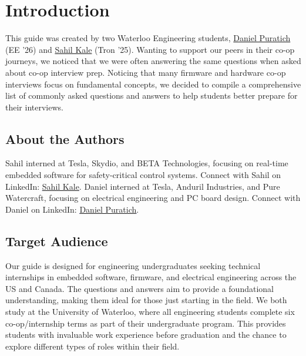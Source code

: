 \documentclass[main.tex]{subfiles}
\begin{document}
\section{Introduction}

This guide was created by two Waterloo Engineering students, \href{https://www.linkedin.com/in/danielpuratich}{Daniel Puratich} (EE '26) and \href{https://www.linkedin.com/in/sahil-kale}{Sahil Kale} (Tron '25). Wanting to support our peers in their co-op journeys, we noticed that we were often answering the same questions when asked about co-op interview prep. Noticing that many firmware and hardware co-op interviews focus on fundamental concepts, we decided to compile a comprehensive list of commonly asked questions and answers to help students better prepare for their interviews.

\subsection{About the Authors}
Sahil interned at Tesla, Skydio, and BETA Technologies, focusing on real-time embedded software for safety-critical control systems. Connect with Sahil on LinkedIn: \textcolor{blue}{\underline{\href{https://www.linkedin.com/in/sahil-kale}{Sahil Kale}}}.
\newline
\newline
Daniel interned at Tesla, Anduril Industries, and Pure Watercraft, focusing on electrical engineering and PC board design. Connect with Daniel on LinkedIn: \textcolor{blue}{\underline{\href{https://www.linkedin.com/in/danielpuratich}{Daniel Puratich}}}.

\subsection{Target Audience}
Our guide is designed for engineering undergraduates seeking technical internships in embedded software, firmware, and electrical engineering across the US and Canada. The questions and answers aim to provide a foundational understanding, making them ideal for those just starting in the field.
\newline
\newline
\noindent We both study at the University of Waterloo, where all engineering students complete six co-op/internship terms as part of their undergraduate program. This provides students with invaluable work experience before graduation and the chance to explore different types of roles within their field.
\end{document}
